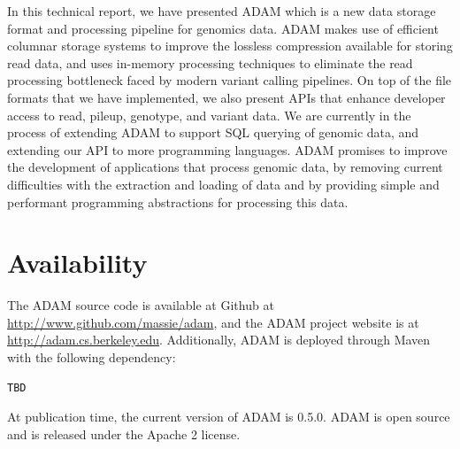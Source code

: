 \documentclass[10pt,twocolumn]{article}
\begin{document}
In this technical report, we have presented ADAM which is a new data storage format and processing pipeline for
genomics data. ADAM makes use of efficient columnar storage systems to improve the lossless compression available
for storing read data, and uses in-memory processing techniques to eliminate the read processing bottleneck faced
by modern variant calling pipelines. On top of the file formats that we have implemented, we also present APIs that enhance
developer access to read, pileup, genotype, and variant data. We are currently in the process of extending ADAM to
support SQL querying of genomic data, and extending our API to more programming languages. ADAM promises
to improve the development of applications that process genomic data, by removing current difficulties with the extraction
and loading of data and by providing simple and performant programming abstractions for processing this data.

\section{Availability}
\label{sec:availability}

The ADAM source code is available at Github at \url{http://www.github.com/massie/adam}, and the ADAM project website
is at \url{http://adam.cs.berkeley.edu}. Additionally, ADAM is deployed through Maven with the following dependency:

\begin{verbatim}
TBD
\end{verbatim}

At publication time, the current version of ADAM is 0.5.0. ADAM is open source and is released under the Apache 2
license.





\clearpage
\end{document}
